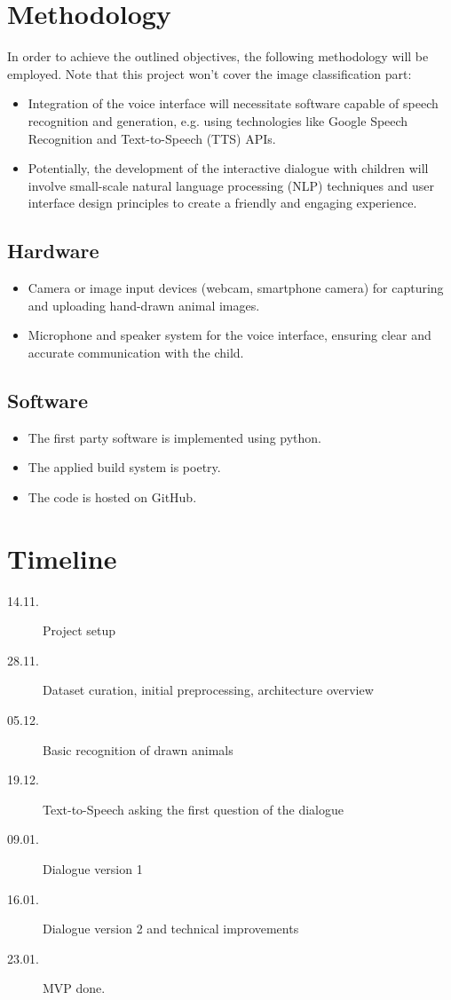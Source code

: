 \section{Methodology}
In order to achieve the outlined objectives, the following methodology will be employed. Note that this project won't cover the image classification part:
\begin{itemize}
  \item Integration of the voice interface will necessitate software capable of speech recognition and generation, e.g. using technologies like Google Speech Recognition and Text-to-Speech (TTS) APIs.
  \item Potentially, the development of the interactive dialogue with children will involve small-scale natural language processing (NLP) techniques and user interface design principles to create a friendly and engaging experience.
\end{itemize}
\subsection{Hardware}
\begin{itemize}
  \item Camera or image input devices (webcam, smartphone camera) for capturing and uploading hand-drawn animal images.
  \item Microphone and speaker system for the voice interface, ensuring clear and accurate communication with the child.
\end{itemize}
\subsection{Software}
\begin{itemize}
  \item The first party software is implemented using python.
  \item The applied build system is poetry.
  \item The code is hosted on GitHub.
\end{itemize}

\section{Timeline}
\begin{description}
\item[14.11.] Project setup
\item[28.11.] Dataset curation, initial preprocessing, architecture overview
\item[05.12.] Basic recognition of drawn animals
\item[19.12.] Text-to-Speech asking the first question of the dialogue
\item[09.01.] Dialogue version 1
\item[16.01.] Dialogue version 2 and technical improvements
\item[23.01.] MVP done.
\end{description}


